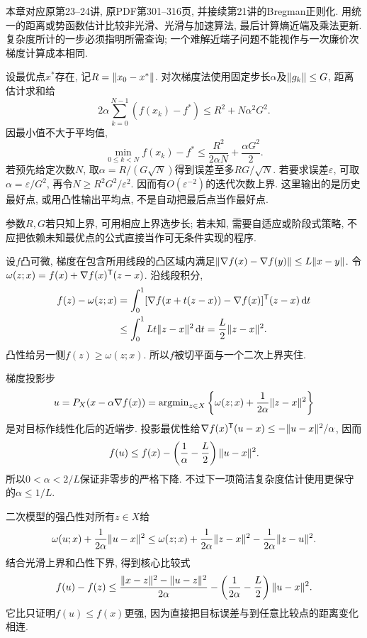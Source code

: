 \label{chap:11}
本章对应原第23--24讲, 原PDF第301--316页, 并接续第21讲的Bregman正则化. 用统一的距离或势函数估计比较非光滑、光滑与加速算法, 最后计算熵近端及乘法更新. 复杂度所计的一步必须指明所需查询; 一个难解近端子问题不能视作与一次廉价次梯度计算成本相同.

设最优点$x^*$存在, 记$R=\lVert x_0-x^*\rVert$. 对次梯度法使用固定步长$\alpha$及$\lVert g_k\rVert\le G$, 距离估计求和给
\[
 2\alpha\sum_{k=0}^{N-1}(f(x_k)-f^*)\le R^2+N\alpha^2G^2.
\]
因最小值不大于平均值,
\begin{equation}\label{eq:subgradient-complexity}
 \min_{0\le k<N}f(x_k)-f^*\le\frac{R^2}{2\alpha N}+\frac{\alpha G^2}{2}.
\end{equation}
若预先给定次数$N$, 取$\alpha=R/(G\sqrt N)$得到误差至多$RG/\sqrt N$. 若要求误差$\varepsilon$, 可取$\alpha=\varepsilon/G^2$, 再令$N\ge R^2G^2/\varepsilon^2$. 因而有$O(\varepsilon^{-2})$的迭代次数上界. 这里输出的是历史最好点, 或用凸性输出平均点, 不是自动把最后点当作最好点.

参数$R,G$若只知上界, 可用相应上界选步长; 若未知, 需要自适应或阶段式策略, 不应把依赖未知最优点的公式直接当作可无条件实现的程序.

设$f$凸可微, 梯度在包含所用线段的凸区域内满足$\lVert \nabla f(x)-\nabla f(y)\rVert\le L\lVert x-y\rVert$. 令$\omega(z;x)=f(x)+\nabla f(x)^{\mathsf T}(z-x)$. 沿线段积分,
\begin{align*}
 f(z)-\omega(z;x)
 &=\int_0^1[\nabla f(x+t(z-x))-\nabla f(x)]^{\mathsf T}(z-x)\,\mathrm dt\\
 &\le\int_0^1 Lt\lVert z-x\rVert^2\,\mathrm dt
 =\frac L2\lVert z-x\rVert^2.
\end{align*}
凸性给另一侧$f(z)\ge\omega(z;x)$. 所以$f$被切平面与一个二次上界夹住.

梯度投影步
\[
 u=P_X(x-\alpha\nabla f(x))
 =\operatorname{argmin}_{z\in X}\left\{\omega(z;x)+\frac1{2\alpha}\lVert z-x\rVert^2\right\}
\]
是对目标作线性化后的近端步. 投影最优性给$\nabla f(x)^{\mathsf T}(u-x)\le-\lVert u-x\rVert^2/\alpha$, 因而
\[
 f(u)\le f(x)-\left(\frac1\alpha-\frac L2\right)\lVert u-x\rVert^2.
\]
所以$0<\alpha<2/L$保证非零步的严格下降. 不过下一项简洁复杂度估计使用更保守的$\alpha\le1/L$.

二次模型的强凸性对所有$z\in X$给
\[
 \omega(u;x)+\frac1{2\alpha}\lVert u-x\rVert^2
 \le\omega(z;x)+\frac1{2\alpha}\lVert z-x\rVert^2-\frac1{2\alpha}\lVert z-u\rVert^2.
\]
结合光滑上界和凸性下界, 得到核心比较式
\begin{equation}\label{eq:gradient-threepoint}
 f(u)-f(z)\le\frac{\lVert x-z\rVert^2-\lVert u-z\rVert^2}{2\alpha}
 -\left(\frac1{2\alpha}-\frac L2\right)\lVert u-x\rVert^2.
\end{equation}
它比只证明$f(u)\le f(x)$更强, 因为直接把目标误差与到任意比较点的距离变化相连.

